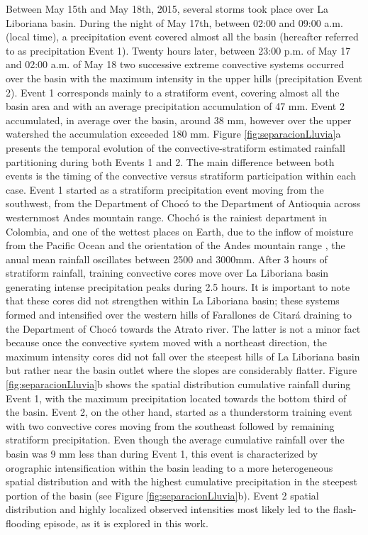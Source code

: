 \documentclass[hess, manuscript]{copernicus}
\begin{document}
Between May 15th and May 18th, 2015, several storms took place over La Liboriana basin.  During the night of May 17th, between 02:00 and 09:00 a.m. (local time), a precipitation event covered almost all the basin (hereafter referred to as precipitation Event 1).  Twenty hours later, between 23:00 p.m. of May 17 and 02:00 a.m. of May 18 two successive extreme convective systems occurred over the basin with the maximum intensity in the upper hills (precipitation Event 2).  Event 1 corresponds mainly to a stratiform event, covering almost all the basin area and with an average precipitation accumulation of 47 $\text{mm}$. Event 2 accumulated, in average over the basin, around 38 $\text{mm}$, however over the upper watershed the accumulation exceeded 180 $\text{mm}$. Figure \ref{fig:separacionLluvia}a presents the temporal evolution of the convective-stratiform estimated rainfall partitioning during both Events 1 and 2. The main difference between both events is the timing of the convective versus stratiform participation within each case. Event 1 started as a stratiform precipitation event moving from the southwest, from the Department of Chocó to the Department of Antioquia across westernmost Andes mountain range. Chochó is the rainiest department in Colombia, and one of the wettest places on Earth, due to the inflow of moisture from the Pacific Ocean and the orientation of the Andes mountain range \citep{poveda2000, Mapes2003}, the anual mean rainfall oscillates between 2500 and 3000mm.  After 3 hours of stratiform rainfall, training convective cores move over La Liboriana basin generating intense precipitation peaks during 2.5 hours. It is important to note that these cores did not strengthen within La Liboriana basin; these systems formed and intensified over the western hills of Farallones de Citará draining to the Department of Chocó towards the Atrato river. The latter is not a minor fact because once the convective system moved with a northeast direction, the maximum intensity cores did not fall over the steepest hills of La Liboriana basin but rather near the basin outlet where the slopes are considerably flatter. Figure \ref{fig:separacionLluvia}b shows the spatial distribution cumulative rainfall during Event 1, with the maximum precipitation located towards the bottom third of the basin. Event 2, on the other hand, started as a thunderstorm training event with two convective cores moving from the southeast followed by remaining stratiform precipitation.  Even though the average cumulative rainfall over the basin was 9 mm less than during Event 1, this event is characterized by orographic intensification within the basin leading to a more heterogeneous spatial distribution and with the highest cumulative precipitation in the steepest portion of the basin (see Figure \ref{fig:separacionLluvia}b). Event 2 spatial distribution and highly localized observed intensities most likely led to the flash-flooding episode, as it is explored in this work. \\
\end{document}
